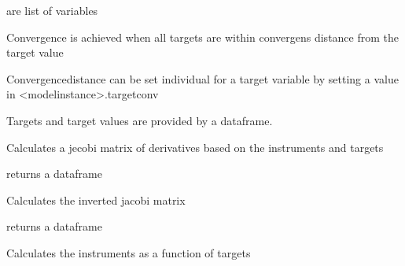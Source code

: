 \documentclass[letterpaper,10pt,english]{sphinxmanual}
\begin{document}
\begin{fulllineitems}
\sphinxAtStartPar
{} are list of variables

\sphinxAtStartPar
Convergence is achieved when all targets are within convergens distance from the target value

\sphinxAtStartPar
Convergencedistance can be set individual for a target variable by setting a value in \textless{}modelinstance\textgreater{}.targetconv

\sphinxAtStartPar
Targets and target values are provided by a dataframe.

\begin{fulllineitems}
\label{\detokenize{used/modelinvert:modelinvert.targets_instruments.jacobi}}
\pysigstartsignatures
{}
\pysigstopsignatures
\sphinxAtStartPar
Calculates a jecobi matrix of derivatives based on the instruments and targets

\sphinxAtStartPar
returns a dataframe

\end{fulllineitems}


\begin{fulllineitems}
\label{\detokenize{used/modelinvert:modelinvert.targets_instruments.invjacobi}}
\pysigstartsignatures
{}
\pysigstopsignatures
\sphinxAtStartPar
Calculates the inverted jacobi matrix

\sphinxAtStartPar
returns a dataframe

\end{fulllineitems}


\begin{fulllineitems}
\label{\detokenize{used/modelinvert:modelinvert.targets_instruments.targetseek}}
\pysigstartsignatures
{}
\pysigstopsignatures
\sphinxAtStartPar
Calculates the instruments as a function of targets


\end{fulllineitems}
\end{fulllineitems}
\end{document}

